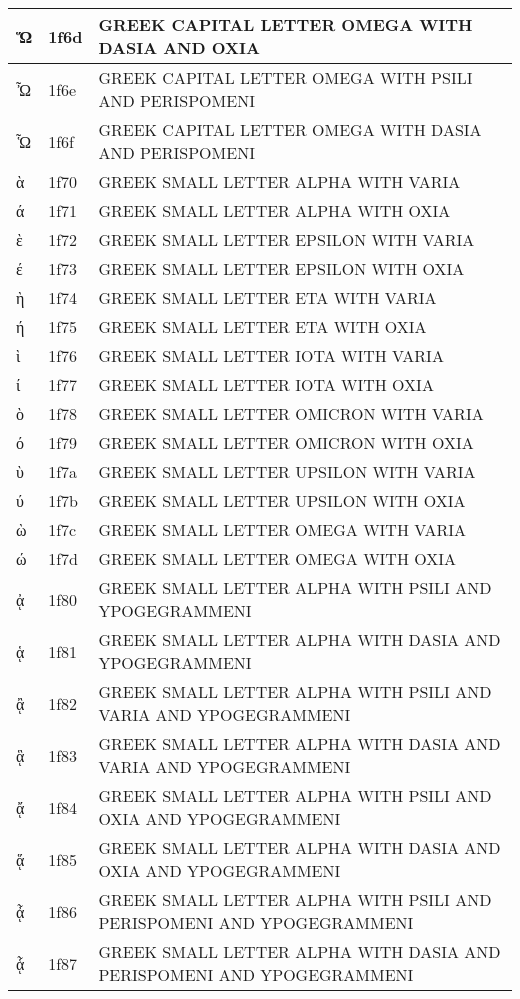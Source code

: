 \documentclass[12pt,letterpaper,openany]{book}
\begin{document}
\begin{center}
\begin{supertabular}{|m{0.25in}|m{0.5in}|m{4in}|}
			Ὥ & 1f6d & GREEK CAPITAL LETTER OMEGA WITH DASIA AND OXIA\\\hline
			Ὦ & 1f6e & GREEK CAPITAL LETTER OMEGA WITH PSILI AND PERISPOMENI\\\hline
			Ὧ & 1f6f & GREEK CAPITAL LETTER OMEGA WITH DASIA AND PERISPOMENI\\\hline
			ὰ & 1f70 & GREEK SMALL LETTER ALPHA WITH VARIA\\\hline
			ά & 1f71 & GREEK SMALL LETTER ALPHA WITH OXIA\\\hline
			ὲ & 1f72 & GREEK SMALL LETTER EPSILON WITH VARIA\\\hline
			έ & 1f73 & GREEK SMALL LETTER EPSILON WITH OXIA\\\hline
			ὴ & 1f74 & GREEK SMALL LETTER ETA WITH VARIA\\\hline
			ή & 1f75 & GREEK SMALL LETTER ETA WITH OXIA\\\hline
			ὶ & 1f76 & GREEK SMALL LETTER IOTA WITH VARIA\\\hline
			ί & 1f77 & GREEK SMALL LETTER IOTA WITH OXIA\\\hline
			ὸ & 1f78 & GREEK SMALL LETTER OMICRON WITH VARIA\\\hline
			ό & 1f79 & GREEK SMALL LETTER OMICRON WITH OXIA\\\hline
			ὺ & 1f7a & GREEK SMALL LETTER UPSILON WITH VARIA\\\hline
			ύ & 1f7b & GREEK SMALL LETTER UPSILON WITH OXIA\\\hline
			ὼ & 1f7c & GREEK SMALL LETTER OMEGA WITH VARIA\\\hline
			ώ & 1f7d & GREEK SMALL LETTER OMEGA WITH OXIA\\\hline
			ᾀ & 1f80 & GREEK SMALL LETTER ALPHA WITH PSILI AND YPOGEGRAMMENI\\\hline
			ᾁ & 1f81 & GREEK SMALL LETTER ALPHA WITH DASIA AND YPOGEGRAMMENI\\\hline
			ᾂ & 1f82 & GREEK SMALL LETTER ALPHA WITH PSILI AND VARIA AND YPOGEGRAMMENI\\\hline
			ᾃ & 1f83 & GREEK SMALL LETTER ALPHA WITH DASIA AND VARIA AND YPOGEGRAMMENI\\\hline
			ᾄ & 1f84 & GREEK SMALL LETTER ALPHA WITH PSILI AND OXIA AND YPOGEGRAMMENI\\\hline
			ᾅ & 1f85 & GREEK SMALL LETTER ALPHA WITH DASIA AND OXIA AND YPOGEGRAMMENI\\\hline
			ᾆ & 1f86 & GREEK SMALL LETTER ALPHA WITH PSILI AND PERISPOMENI AND YPOGEGRAMMENI\\\hline
			ᾇ & 1f87 & GREEK SMALL LETTER ALPHA WITH DASIA AND PERISPOMENI AND YPOGEGRAMMENI\\\hline

\end{supertabular}
\end{center}
\end{document}
